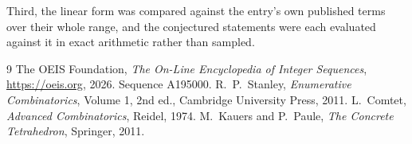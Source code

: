 \documentclass[11pt,a4paper]{article}
\theoremstyle{plain}
\theoremstyle{definition}
\begin{document}
Third, the linear form was compared against the entry's own published terms over their whole
range, and the conjectured statements were each evaluated against it in exact arithmetic
rather than sampled.

\begin{thebibliography}{9}
 The OEIS Foundation, \emph{The On-Line Encyclopedia of Integer
Sequences}, \url{https://oeis.org}, 2026. Sequence A195000.
 R.~P.~Stanley, \emph{Enumerative Combinatorics}, Volume 1, 2nd ed.,
Cambridge University Press, 2011.
 L.~Comtet, \emph{Advanced Combinatorics}, Reidel, 1974.
 M.~Kauers and P.~Paule, \emph{The Concrete Tetrahedron}, Springer, 2011.
\end{thebibliography}
\end{document}
